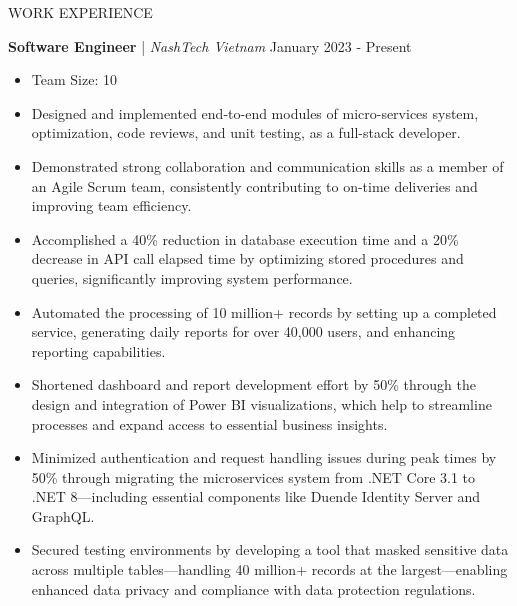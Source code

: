 \begin{rSection}{WORK EXPERIENCE}

      \quad\textbf{Software Engineer} | \textit{NashTech Vietnam} \hfill January 2023 - Present\\
      \begin{itemize}
            \itemsep 0pt {} \vspace{-1em}

            \item Team Size: 10

            \item Designed and implemented end-to-end modules of micro-services system, optimization,
                  code reviews, and unit testing, as a full-stack developer.

            \item Demonstrated strong collaboration and communication skills as a member of an Agile Scrum team,
                  consistently contributing to on-time deliveries and improving team efficiency.

            \item Accomplished a 40\% reduction in database execution time and a 20\% decrease in API call elapsed time
                  by optimizing stored procedures and queries, significantly improving system performance.

            \item Automated the processing of 10 million+ records by setting up a completed service,
                  generating daily reports for over 40,000 users, and enhancing reporting capabilities.

            \item Shortened dashboard and report development effort by 50\% through the design and integration of Power BI visualizations,
                  which help to streamline processes and expand access to essential business insights.

            \item Minimized authentication and request handling issues during peak times by 50\% through migrating the microservices
                  system from .NET Core 3.1 to .NET 8—including essential components like Duende Identity Server and GraphQL.

            \item Secured testing environments by developing a tool that masked sensitive data across multiple tables—handling 40 million+ records at the largest—enabling
                  enhanced data privacy and compliance with data protection regulations.


\end{itemize}
\end{rSection}
